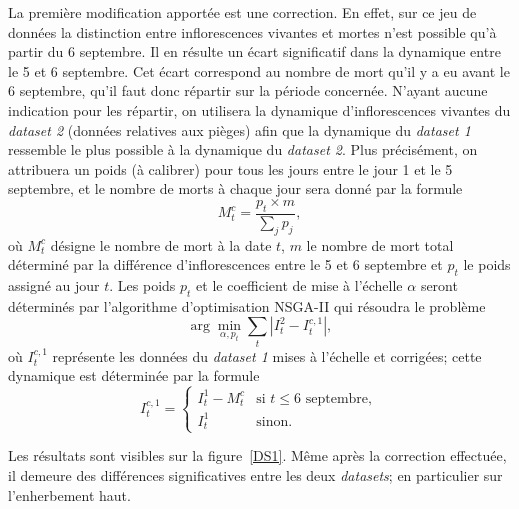 \documentclass[a4paper, 11pt]{article}
\begin{document}
La première modification apportée est une correction. En effet, sur ce jeu de données la distinction entre inflorescences vivantes et mortes n'est possible qu'à partir du 6 septembre. Il en résulte un écart significatif dans la dynamique entre le 5 et 6 septembre. Cet écart correspond au nombre de mort qu'il y a eu avant le 6 septembre, qu'il faut donc répartir sur la période concernée. N'ayant aucune indication pour les répartir, on utilisera la dynamique d'inflorescences vivantes du \textit{dataset 2} (données relatives aux pièges) afin que la dynamique du \textit{dataset 1} ressemble le plus possible à la dynamique du \textit{dataset 2}. Plus précisément, on attribuera un poids (à calibrer) pour tous les jours entre le jour 1 et le 5 septembre, et
le nombre de morts à chaque jour sera donné par la formule
$$M_t^c = \frac{p_t \times m}{\sum_j p_j},$$
où $M_t^c$ désigne le nombre de mort à la date $t$, $m$ le nombre de mort total déterminé par la différence d’inflorescences entre le 5 et 6 septembre et $p_t$ le poids assigné au jour $t$. Les poids $p_t$ et le coefficient de mise à l'échelle $\alpha$ seront déterminés par l'algorithme d'optimisation NSGA-II qui résoudra le problème
$$\arg\min_{\alpha, p_t} \sum_t \left| I_t^2 - I_t^{c,1} \right|,$$
où $I_t^{c,1}$ représente les données du \textit{dataset 1} mises à l'échelle et corrigées; cette dynamique est déterminée par la formule
$$I_t^{c,1} = \begin{cases}
                I_t^1 - M_t^c & \mbox{si } t \leq 6 \mbox{ septembre},\\
                I_t^1 & \mbox{sinon}.
               \end{cases}$$


Les résultats sont visibles sur la figure~\ref{DS1}. Même après la correction effectuée, il demeure des différences significatives entre les deux \textit{datasets}; en particulier sur l'enherbement haut.

%  
% 
\end{document}
